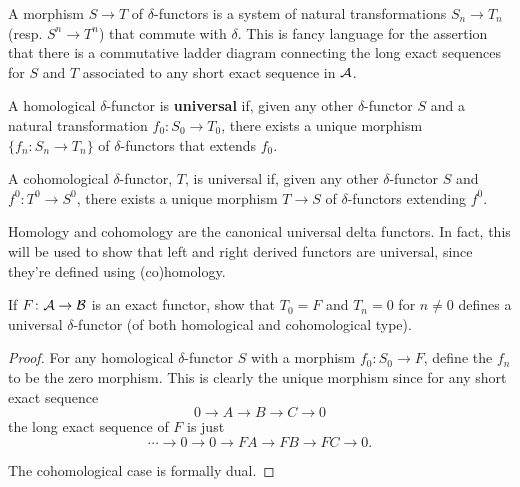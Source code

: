 \documentclass[reqno, 12pt]{amsart}
\begin{document}
\begin{definition}
  A morphism $S \to T$ of $\delta$-functors is a system of natural transformations $S_n \to T_n$ (resp. $S^n \to T^n$) that commute with $\delta$.
  This is fancy language for the assertion that there is a commutative ladder diagram connecting the long exact sequences for $S$ and $T$ associated to any short exact sequence in $\mathcal{A}$.

  A homological $\delta$-functor is \textbf{universal} if, given any other $\delta$-functor $S$ and a natural transformation $f_0 \colon S_0 \to T_0$, there exists a unique morphism $\{f_n \colon S_n \to T_n\}$ of $\delta$-functors that extends $f_0$.

  A cohomological $\delta$-functor, $T$, is universal if, given any other $\delta$-functor $S$ and $f^0 \colon T^0 \to S^0$, there exists a unique morphism $T \to S$ of $\delta$-functors extending $f^0$.
\end{definition}

\begin{example}
  Homology and cohomology are the canonical universal delta functors.
  In fact, this will be used to show that left and right derived functors are universal, since they're defined using (co)homology.
\end{example}

\begin{exercise}
  If $F \colon \mathcal{A} \to \mathcal{B}$ is an exact functor, show that $T_0 = F$ and $T_n = 0$ for $n \neq 0$ defines a universal $\delta$-functor (of both homological and cohomological type).
\end{exercise}
\begin{proof}
  For any homological $\delta$-functor $S$ with a morphism $f_0 \colon S_0 \to F$, define the $f_n$ to be the zero morphism.
  This is clearly the unique morphism since for any short exact sequence
  $$0 \to A \to B \to C \to 0$$
  the long exact sequence of $F$ is just
  $$\cdots \to 0 \to 0 \to FA \to FB \to FC \to 0.$$

  The cohomological case is formally dual.
\end{proof}




\end{document}
